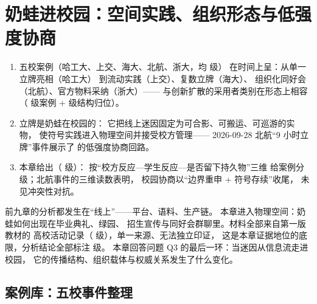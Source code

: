 \chapter{奶蛙进校园：空间实践、组织形态与低强度协商}\label{ch:10}

\begin{nlkeypoints}
  \begin{enumerate}[label=(\arabic*),leftmargin=2.4em]
    \item 五校案例（哈工大、上交、海大、北航、浙大，均  级）
          在时间上呈：从单一立牌亮相（哈工大）
          到流动实践（上交）、复数立牌（海大）、
          组织化同好会（北航）、官方物料采纳（浙大）——
          与创新扩散的采用者类别在形态上相容
          （ 级案例 +  级结构归位）。
    \item 立牌是奶蛙在校园的：
          它把线上迷因固定为可合影、可搬运、可巡游的实物，
          使符号实践进入物理空间并接受校方管理——
          2026-09-28 北航“9 小时立牌”事件展示了
          的低强度协商回路。
    \item 本章给出（ 级）：
          按“校方反应—学生反应—是否留下持久物”三维
          给案例分级；北航事件的三维读数表明，
          校园协商以“边界重申 + 符号存续”收尾，
          未见冲突性对抗。
  \end{enumerate}
\end{nlkeypoints}

前九章的分析都发生在“线上”——平台、语料、生产链。
本章进入物理空间：奶蛙如何出现在毕业典礼、绿园、
招生宣传与同好会群聊里。材料全部来自第一版教材的
高校活动记录（ 级），单一来源、无法独立印证，
这是本章证据地位的底限，分析结论全部标注  级。
本章回答问题 Q3 的最后一环：当迷因从信息流走进校园，
它的传播结构、组织载体与权威关系发生了什么变化。

\section{案例库：五校事件整理}\label{sec:10:cases}

